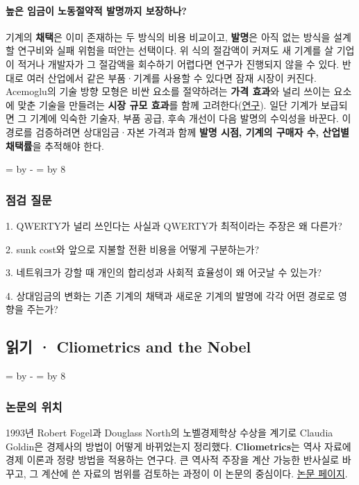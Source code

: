 \documentclass[10pt,a4paper]{article}
\newcommand{\ReserveReadingSectionSpace}{%
  \par\begingroup
  \dimen0=\pagegoal \advance\dimen0 by -\pagetotal
  \dimen2=\baselineskip \multiply\dimen2 by 8
  \ifdim\dimen0<\dimen2 \newpage\fi
  \endgroup}
\begin{document}
\paragraph{높은 임금이 노동절약적 발명까지 보장하나?}
기계의 \textbf{채택}은 이미 존재하는 두 방식의 비용 비교이고, \textbf{발명}은 아직 없는 방식을 설계할 연구비와 실패 위험을 떠안는 선택이다. 위 식의 절감액이 커져도 새 기계를 살 기업이 적거나 개발자가 그 절감액을 회수하기 어렵다면 연구가 진행되지 않을 수 있다. 반대로 여러 산업에서 같은 부품·기계를 사용할 수 있다면 잠재 시장이 커진다. Acemoglu의 기술 방향 모형은 비싼 요소를 절약하려는 \textbf{가격 효과}와 널리 쓰이는 요소에 맞춘 기술을 만들려는 \textbf{시장 규모 효과}를 함께 고려한다(\href{https://economics.mit.edu/sites/default/files/publications/Factor\%20Prices\%20and\%20Technical\%20Change\%20from\%20Induced\%20In.pdf}{연구}). 일단 기계가 보급되면 그 기계에 익숙한 기술자, 부품 공급, 후속 개선이 다음 발명의 수익성을 바꾼다. 이 경로를 검증하려면 상대임금·자본 가격과 함께 \textbf{발명 시점, 기계의 구매자 수, 산업별 채택률}을 추적해야 한다.\par

\ReserveReadingSectionSpace
\subsubsection*{점검 질문}

1. QWERTY가 널리 쓰인다는 사실과 QWERTY가 최적이라는 주장은 왜 다른가?\par
2. sunk cost와 앞으로 지불할 전환 비용을 어떻게 구분하는가?\par
3. 네트워크가 강할 때 개인의 합리성과 사회적 효율성이 왜 어긋날 수 있는가?\par
4. 상대임금의 변화는 기존 기계의 채택과 새로운 기계의 발명에 각각 어떤 경로로 영향을 주는가?\par


\clearpage{}
{}
\subsection*{읽기 · Cliometrics and the Nobel}
\ReserveReadingSectionSpace
\subsubsection*{논문의 위치}

1993년 Robert Fogel과 Douglass North의 노벨경제학상 수상을 계기로 Claudia Goldin은 경제사의 방법이 어떻게 바뀌었는지 정리했다. \textbf{Cliometrics}는 역사 자료에 경제 이론과 정량 방법을 적용하는 연구다. 큰 역사적 주장을 계산 가능한 반사실로 바꾸고, 그 계산에 쓴 자료의 범위를 검토하는 과정이 이 논문의 중심이다. \href{https://www.aeaweb.org/articles?id=10.1257/jep.9.2.191}{논문 페이지}.\par
\end{document}
